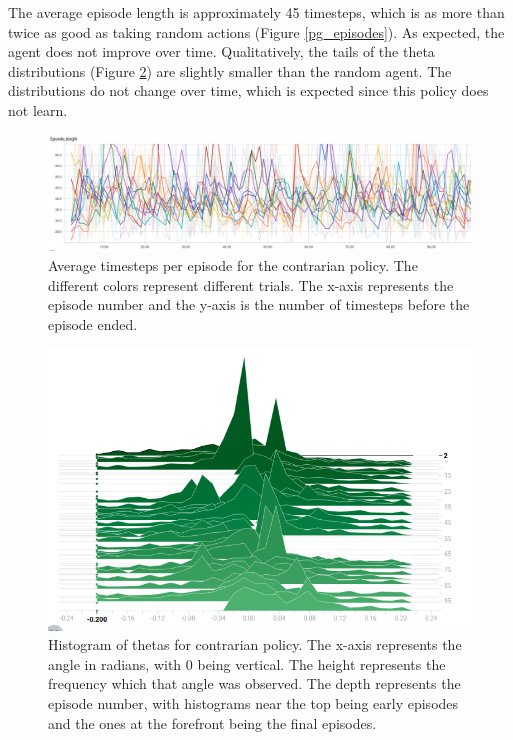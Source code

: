 \documentclass[12pt,a4paper]{article}
\begin{document}
The average episode length is approximately 45 timesteps, which is as more than twice as good as taking random actions (Figure \ref{pg_episodes}). As expected, the agent does not improve over time.  Qualitatively, the tails of the theta distributions (Figure \ref{contrarian_thetas}) are slightly smaller than the random agent. The distributions do not change over time, which is expected since this policy does not learn. 

\begin{figure}[htbp]
\begin{center}
\includegraphics[width=\linewidth]{contrarian_lengths.png}
\caption{Average timesteps per episode for the contrarian policy. The different colors represent different trials. The x-axis represents the episode number and the y-axis is the number of timesteps before the episode ended. }
\label{contrarian_lengths}
\end{center}
\end{figure}

\begin{figure}[htbp]
\begin{center}
\includegraphics[width=\linewidth]{contrarian_thetas.png}
\caption{Histogram of thetas for contrarian policy. The x-axis represents the angle in radians, with 0 being vertical. The height represents the frequency which that angle was observed. The depth represents the episode number, with histograms near the top being early episodes and the ones at the forefront being the final episodes.}
\label{contrarian_thetas}
\end{center}
\end{figure}
\end{document}
